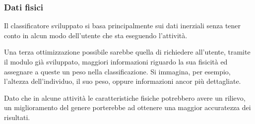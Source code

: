 \subsubsection{Dati fisici}
Il classificatore sviluppato si basa principalmente sui dati inerziali senza tener conto in alcun modo dell'utente 
che sta eseguendo l'attività.

\vspace{5mm} %

Una terza ottimizzazione possibile sarebbe quella di richiedere all'utente, tramite il modulo già sviluppato, maggiori 
informazioni riguardo la sua fisicità ed assegnare a queste un peso nella classificazione. Si immagina, per esempio, l'altezza 
dell'individuo, il suo peso, oppure informazioni ancor più dettagliate.

Dato che in alcune attività le caratteristiche fisiche potrebbero avere un rilievo, un miglioramento del genere porterebbe ad 
ottenere una maggior accuratezza dei risultati.